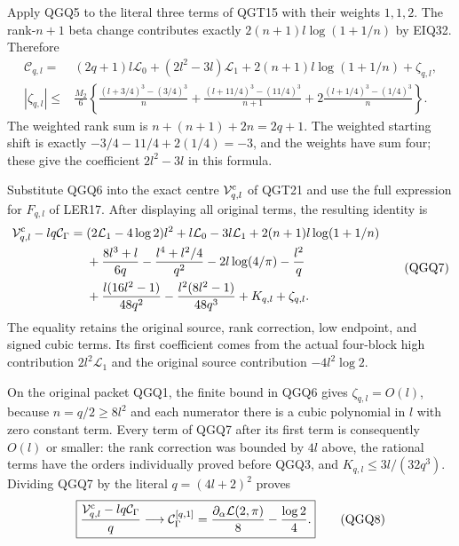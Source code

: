 \documentclass[11pt,a4paper]{article}
\begin{document}
Apply QGQ5 to the literal three terms of QGT15 with their weights
$1,1,2$. The rank-$n+1$ beta change contributes exactly
$2(n+1)l\log(1+1/n)$ by EIQ32. Therefore
\[
\begin{split}
 \mathcal C_{q,l}={}&(2q+1)l\mathcal L_0
 +(2l^2-3l)\mathcal L_1
 +2(n+1)l\log(1+1/n)+\zeta_{q,l},\\
 |\zeta_{q,l}|\le{}&\frac{M_2}{6}
 \left\{
 \frac{(l+3/4)^3-(3/4)^3}{n}
 +\frac{(l+11/4)^3-(11/4)^3}{n+1}
 +2\frac{(l+1/4)^3-(1/4)^3}{n}
 \right\}.
\end{split}
 \tag{QGQ6}
\]
The weighted rank sum is $n+(n+1)+2n=2q+1$.
The weighted starting shift is exactly
$-3/4-11/4+2(1/4)=-3$, and the weights have sum four;
these give the coefficient $2l^2-3l$ in this formula.

Substitute QGQ6 into the exact centre $\mathcal V^{\rm c}_{q,l}$
of QGT21 and use the full expression for $F_{q,l}$ of LER17.
After displaying all original terms, the resulting identity is
\[
\begin{split}
 \mathcal V^{\rm c}_{q,l}-lq\mathcal C_\Gamma
 ={}&(2\mathcal L_1-4\log2)l^2
       +l\mathcal L_0-3l\mathcal L_1
       +2(n+1)l\log(1+1/n)\\
 &+\frac{8l^3+l}{6q}-\frac{l^4+l^2/4}{q^2}
       -2l\log(4/\pi)-\frac{l^2}{q}\\
 &+\frac{l(16l^2-1)}{48q^2}
       -\frac{l^2(8l^2-1)}{48q^3}+K_{q,l}+\zeta_{q,l}.
\end{split}
 \tag{QGQ7}
\]
The equality retains the original source, rank correction, low endpoint,
and signed cubic terms. Its first coefficient comes from the actual
four-block high contribution $2l^2\mathcal L_1$ and the original
source contribution $-4l^2\log2$.

On the original packet QGQ1, the finite bound in QGQ6 gives
$\zeta_{q,l}=O(l)$, because $n=q/2\ge8l^2$ and each numerator
there is a cubic polynomial in $l$ with zero constant term.
Every term of QGQ7 after its first term is consequently $O(l)$
or smaller: the rank correction was bounded by $4l$ above, the
rational terms have the orders individually proved before QGQ3,
and $K_{q,l}\le3l/(32q^3)$. Dividing QGQ7 by the literal
$q=(4l+2)^2$ proves
\[
 \boxed{\displaystyle
 \frac{\mathcal V^{\rm c}_{q,l}-lq\mathcal C_\Gamma}{q}
             \longrightarrow\mathcal C_\Gamma^{[q,1]}
             =\frac{\partial_\alpha\mathcal L(2,\pi)}8
                                  -\frac{\log2}{4}.}
 \tag{QGQ8}
\]
\end{document}
